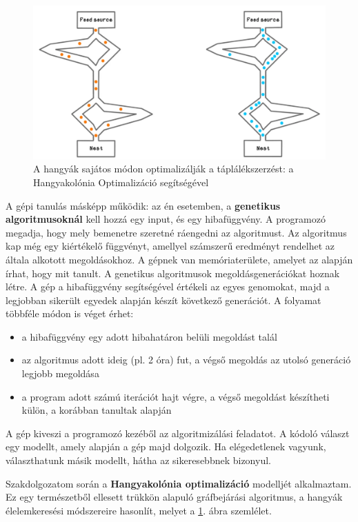 \begin{figure}[ht!]
	\includegraphics[width=150mm, keepaspectratio]{figures/aco-visualization.png}
	\caption{A hangyák sajátos módon optimalizálják a táplálékszerzést: a Hangyakolónia Optimalizáció segítségével \cite{ACOimage} \label{ACOvisulabel}}
\end{figure}
A gépi tanulás másképp működik: az én esetemben, a \textbf{genetikus algoritmusoknál} kell hozzá egy input, és egy hibafüggvény. A programozó megadja, hogy mely bemenetre szeretné ráengedni az algoritmust. Az algoritmus kap még egy kiértékelő függvényt, amellyel számszerű eredményt rendelhet az általa alkotott megoldásokhoz. A gépnek van memóriaterülete, amelyet az alapján írhat, hogy mit tanult. A genetikus algoritmusok megoldásgenerációkat hoznak létre. A gép a hibafüggvény segítségével értékeli az egyes genomokat, majd a legjobban sikerült egyedek alapján készít következő generációt. A folyamat többféle módon is véget érhet:
\begin{itemize}
	\item a hibafüggvény egy adott hibahatáron belüli megoldást talál
	\item az algoritmus adott ideig (pl. 2 óra) fut, a végső megoldás az utolsó generáció legjobb megoldása
	\item a program adott számú iterációt hajt végre, a végső megoldást készítheti külön, a korábban tanultak alapján
\end{itemize}

A gép kiveszi a programozó kezéből az algoritmizálási feladatot. A kódoló választ egy modellt, amely alapján a gép majd dolgozik. Ha elégedetlenek vagyunk, választhatunk másik modellt, hátha az sikeresebbnek bizonyul.

Szakdolgozatom során a \textbf{Hangyakolónia optimalizáció} modelljét alkalmaztam. Ez egy természetből ellesett trükkön alapuló gráfbejárási algoritmus, a hangyák élelemkeresési módszereire hasonlít, melyet a \ref{ACOvisulabel}. ábra szemlélet.

